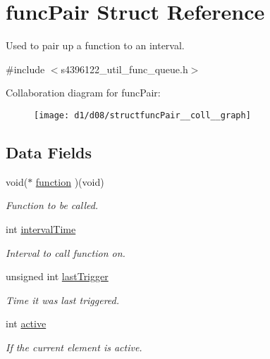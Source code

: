 \hypertarget{structfuncPair}{}\section{func\+Pair Struct Reference}
\label{structfuncPair}


Used to pair up a function to an interval.  




{\ttfamily \#include $<$s4396122\+\_\+util\+\_\+func\+\_\+queue.\+h$>$}



Collaboration diagram for func\+Pair\+:\nopagebreak
\begin{figure}[H]
\begin{center}
\leavevmode
\texttt{[image: d1/d08/structfuncPair\_\_coll\_\_graph]}
\end{center}
\end{figure}
\subsection*{Data Fields}
\begin{DoxyCompactItemize}
\item 
void($\ast$ \hyperlink{structfuncPair_a45428448903165e15b2c8e36fc1b5eda}{function} )(void)\hypertarget{structfuncPair_a45428448903165e15b2c8e36fc1b5eda}{}\label{structfuncPair_a45428448903165e15b2c8e36fc1b5eda}

\begin{DoxyCompactList}\small\item\em Function to be called. \end{DoxyCompactList}\item 
int \hyperlink{structfuncPair_a6ffa932fa7c4c28ab86b4d8d88534caa}{interval\+Time}\hypertarget{structfuncPair_a6ffa932fa7c4c28ab86b4d8d88534caa}{}\label{structfuncPair_a6ffa932fa7c4c28ab86b4d8d88534caa}

\begin{DoxyCompactList}\small\item\em Interval to call function on. \end{DoxyCompactList}\item 
unsigned int \hyperlink{structfuncPair_af384061348a84871684a027a4f407a43}{last\+Trigger}\hypertarget{structfuncPair_af384061348a84871684a027a4f407a43}{}\label{structfuncPair_af384061348a84871684a027a4f407a43}

\begin{DoxyCompactList}\small\item\em Time it was last triggered. \end{DoxyCompactList}\item 
int \hyperlink{structfuncPair_a94ea97cd0c02cf5204435a2666abb93b}{active}\hypertarget{structfuncPair_a94ea97cd0c02cf5204435a2666abb93b}{}\label{structfuncPair_a94ea97cd0c02cf5204435a2666abb93b}

\begin{DoxyCompactList}\small\item\em If the current element is active. \end{DoxyCompactList}\end{DoxyCompactItemize}


